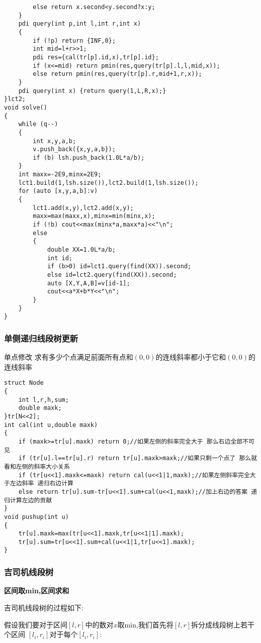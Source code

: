 \documentclass[a4paper]{ctexart}
\begin{document}
\begin{lstlisting}
        else return x.second<y.second?x:y;
    }
    pdi query(int p,int l,int r,int x)
    {
        if (!p) return {INF,0};
        int mid=l+r>>1;
        pdi res={cal(tr[p].id,x),tr[p].id};
        if (x<=mid) return pmin(res,query(tr[p].l,l,mid,x));
        else return pmin(res,query(tr[p].r,mid+1,r,x));
    }
    pdi query(int x) {return query(1,L,R,x);}
}lct2;
void solve()
{
    while (q--)
    {
        int x,y,a,b;
        v.push_back({x,y,a,b});
        if (b) lsh.push_back(1.0L*a/b);
    }
    int maxx=-2E9,minx=2E9;
    lct1.build(1,lsh.size()),lct2.build(1,lsh.size());
    for (auto [x,y,a,b]:v)
    {
        lct1.add(x,y),lct2.add(x,y);
        maxx=max(maxx,x),minx=min(minx,x);
        if (!b) cout<<max(minx*a,maxx*a)<<"\n";
        else
        {
            double XX=1.0L*a/b;
            int id;
            if (b>0) id=lct1.query(find(XX)).second;
            else id=lct2.query(find(XX)).second;
            auto [X,Y,A,B]=v[id-1];
            cout<<a*X+b*Y<<"\n";
        }
    }
}
\end{lstlisting}

\subsubsection{单侧递归线段树更新}
单点修改 \quad 求有多少个点满足前面所有点和$(0,0)$的连线斜率都小于它和$(0,0)$的连线斜率

\begin{lstlisting}
struct Node
{
    int l,r,h,sum;
    double maxk;
}tr[N<<2];
int cal(int u,double maxk)
{
    if (maxk>=tr[u].maxk) return 0;//如果左侧的斜率完全大于 那么右边全部不可见
    if (tr[u].l==tr[u].r) return tr[u].maxk>maxk;//如果只剩一个点了 那么就看和左侧的斜率大小关系
    if (tr[u<<1].maxk<=maxk) return cal(u<<1|1,maxk);//如果左侧斜率完全大于左边斜率 递归右边计算
    else return tr[u].sum-tr[u<<1].sum+cal(u<<1,maxk);//加上右边的答案 递归计算左边的贡献
}
void pushup(int u)
{
    tr[u].maxk=max(tr[u<<1].maxk,tr[u<<1|1].maxk);
    tr[u].sum=tr[u<<1].sum+cal(u<<1|1,tr[u<<1].maxk);
}
\end{lstlisting}

\subsubsection{吉司机线段树}

\textbf{区间取min,区间求和}

吉司机线段树的过程如下:

假设我们要对于区间$[l,r]$中的数对$x$取min,我们首先将$[l,r]$拆分成线段树上若干个区间 
$[l_i,r_i]$对于每个$[l_i,r_i]$:
\end{document}
